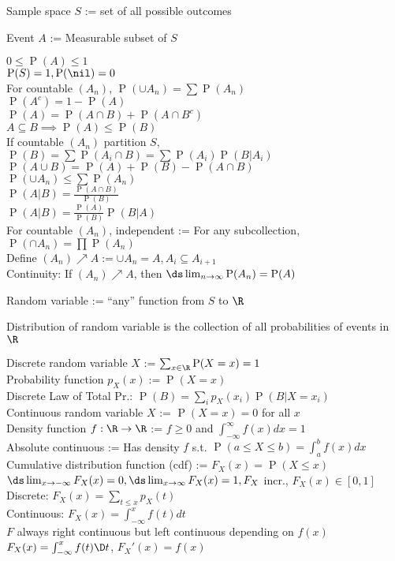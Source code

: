 \documentclass[12pt]{LatexTemplate/hw}
\renewcommand{\Pr}{\operatorname{P}}
\begin{document}
Sample space $S$ := set of all possible outcomes

Event $A$ := Measurable subset of $S$

$0\le \Pr(A)\le 1$\\
$\Pr(S)=1, \Pr(\nil)=0$\\
For countable $(A_n)$, $\Pr(\cup A_n)=\sum \Pr(A_n)$\\
$\Pr(A^c)=1-\Pr(A)$\\
$\Pr(A)=\Pr(A\cap B)+\Pr(A\cap B^c)$\\
$A\subseteq B\implies \Pr(A)\le \Pr(B)$\\
If countable $(A_n)$ partition $S$, \\
$\Pr(B)=\sum \Pr(A_i\cap B)=\sum \Pr(A_i)\Pr(B|A_i)$\\
$\Pr(A\cup B)=\Pr(A)+\Pr(B)-\Pr(A\cap B)$\\
$\Pr(\cup A_n)\le \sum \Pr(A_n)$\\
$\Pr(A | B)=\frac{\Pr(A\cap B)}{\Pr(B)}$\\
$\Pr(A|B)=\frac{\Pr(A)}{\Pr(B)}\Pr(B|A)$\\
For countable $(A_n)$, independent := For any subcollection, $\Pr(\cap A_n)=\prod \Pr(A_n)$\\
Define $(A_n)\nearrow A:=\cup A_n=A, A_i\subseteq A_{i+1}$\\
Continuity: If $(A_n)\nearrow A$, then $\ds\lim_{n\to\infty}\Pr(A_n)=\Pr(A)$

Random variable := ``any'' function from $S$ to $\R$

Distribution of random variable is the collection of all probabilities of events in $\R$

Discrete random variable $X$ := $\sum_{x\in\R} \Pr(X=x)=1$\\
Probability function $p_X(x):=\Pr(X=x)$\\
Discrete Law of Total Pr.: $\Pr(B)=\sum_i p_X(x_i)\Pr(B|X=x_i)$\\
Continuous random variable $X$ := $\Pr(X=x)=0$ for all $x$\\
Density function $f:\R\to\R$ := $f\ge0$ and $\int_{-\infty}^\infty f(x)dx=1$\\
Absolute continuous := Has density $f$ s.t. $\Pr(a\le X\le b)=\int_a^b f(x)dx$\\
Cumulative distribution function (cdf) := $F_X(x)=\Pr(X\le x)$\\
$\ds\lim_{x\to-\infty} F_X(x)=0, \ds\lim_{x\to\infty} F_X(x)=1, F_X$ incr., $F_X(x)\in[0,1]$\\
Discrete: $F_X(x)=\sum_{t\le x} p_X(t)$\\
Continuous: $F_X(x)=\int_{-\infty}^x f(t)dt$\\
$F$ always right continuous but left continuous depending on $f(x)$\\
$F_X(x)=\int_{-\infty}^x f(t)\D t$, $F_X'(x)=f(x)$
\end{document}
